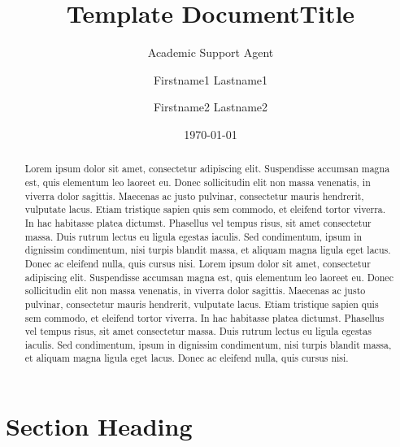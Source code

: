 \documentclass{article}
\title{Template Document}
\author{Academic Support Agent}
\date{\today}
\begin{document}
\maketitle

\title{Title}

\author{Firstname1 Lastname1}
\author{Firstname2 Lastname2}

\date{}

\maketitle

\begin{abstract}
Lorem ipsum dolor sit amet, consectetur adipiscing elit. Suspendisse accumsan magna est, quis elementum leo laoreet eu. Donec sollicitudin elit non massa venenatis, in viverra dolor sagittis. Maecenas ac justo pulvinar, consectetur mauris hendrerit, vulputate lacus. Etiam tristique sapien quis sem commodo, et eleifend tortor viverra. In hac habitasse platea dictumst. Phasellus vel tempus risus, sit amet consectetur massa. Duis rutrum lectus eu ligula egestas iaculis. Sed condimentum, ipsum in dignissim condimentum, nisi turpis blandit massa, et aliquam magna ligula eget lacus. Donec ac eleifend nulla, quis cursus nisi. Lorem ipsum dolor sit amet, consectetur adipiscing elit. Suspendisse accumsan magna est, quis elementum leo laoreet eu. Donec sollicitudin elit non massa venenatis, in viverra dolor sagittis. Maecenas ac justo pulvinar, consectetur mauris hendrerit, vulputate lacus. Etiam tristique sapien quis sem commodo, et eleifend tortor viverra. In hac habitasse platea dictumst. Phasellus vel tempus risus, sit amet consectetur massa. Duis rutrum lectus eu ligula egestas iaculis. Sed condimentum, ipsum in dignissim condimentum, nisi turpis blandit massa, et aliquam magna ligula eget lacus. Donec ac eleifend nulla, quis cursus nisi.
\end{abstract}


\section{Section Heading}
\end{document}
